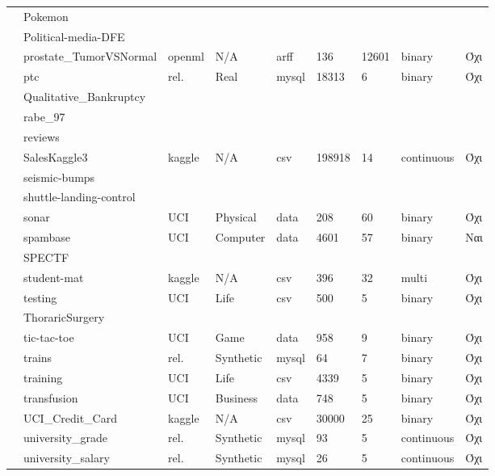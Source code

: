 {\begin{longtable}{|l| l| l | l | l | l |l | l | l | }
 			\rownumber & Pokemon & & & & & & & \\
 			\rownumber & Political-media-DFE & & & & & & & \\
 			\rownumber & prostate\_TumorVSNormal & openml & N/A & arff & 136 & 12601  & binary & Όχι \\
 			\rownumber & ptc \citep{Helma2001,} & rel.& Real  & mysql & 18313 & 6 & binary & Όχι \\
 			\rownumber & Qualitative\_Bankruptcy & & & & & & & \\
 			\rownumber & rabe\_97 & & & & & & & \\
 			\rownumber & reviews & & & & & & & \\
 			\rownumber & SalesKaggle3 \citep{sales} & kaggle & N/A & csv & 198918 & 14 & continuous & Όχι \\
 			\rownumber & seismic-bumps & & & & & & & \\
 			\rownumber & shuttle-landing-control & & & & & & & \\
 			\rownumber & sonar & UCI & Physical & data & 208 & 60 & binary  & Όχι \\
 			\rownumber & spambase \citep{spam} & UCI & Computer & data & 4601 & 57 & binary & Ναι  \\
 			\rownumber & SPECTF & & & & & & & \\
 			\rownumber & student-mat \citep{alcohol} & kaggle & N/A & csv & 396 & 32 & multi & Όχι \\
 			\rownumber & testing \citep{wilt} & UCI & Life & csv & 500 & 5 & binary & Όχι \\
 			\rownumber & ThoraricSurgery & & & & & & & \\
 			\rownumber & tic-tac-toe \citep{tic} & UCI & Game & data & 958 & 9 &  binary & Όχι \\
 			\rownumber & trains \citep{Trains} & rel. & Synthetic & mysql & 64 & 7 & binary & Όχι \\
 			\rownumber & training \citep{wilt} & UCI & Life  & csv & 4339 & 5 & binary & Όχι \\
 			\rownumber & transfusion & UCI & Business & data & 748 & 5 & binary& Όχι \\
 			\rownumber & UCI\_Credit\_Card & kaggle & N/A & csv & 30000 & 25 & binary & Όχι \\
 			\rownumber & university\_grade \citep{uni} & rel. & Synthetic & mysql & 93 & 5  & continuous & Όχι \\
 			\rownumber & university\_salary \citep{uni} & rel. & Synthetic & mysql & 26 & 5 & continuous & Όχι \\

\end{longtable}}
